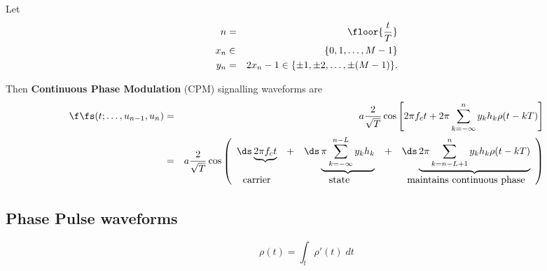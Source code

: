 \begin{definition}
\label{def:CPM}
Let 
\begin{eqnarray*}
   n   & = & \floor{\frac{t}{T}} \\
   x_n &\in& \{0,1,\ldots, M-1 \} \\
   y_n & = & 2x_n -1 \in \{ \pm1, \pm2,\ldots, \pm(M-1)\}.
\end{eqnarray*}

Then
{\bf Continuous Phase Modulation} (CPM) signalling waveforms are
\begin{eqnarray*}
   \f\fs(t;\ldots,u_{n-1},u_n)
     &=& a \frac{2}{\sqrt{T}} 
           \cos\left[ 
              2\pi f_ct + 
              2\pi\sum_{k=-\infty}^n y_k h_k \rho(t-kT)
           \right]
   \\&=& a \frac{2}{\sqrt{T}} 
           \cos\left( \begin{array}{ccccc}
              \ds \underbrace{2\pi f_ct} &+&
              \ds \underbrace{\pi \sum_{k=-\infty}^{n-L} y_k h_k}  &+&
              \ds \underbrace{2\pi \sum_{k=n-L+1}^n y_k h_k \rho(t-kT)}
              \\
              \mbox{carrier} && \mbox{state} && \mbox{maintains continuous phase}
           \end{array}
           \right)
\end{eqnarray*}
\end{definition}


\subsection{Phase Pulse waveforms}
\[   \rho(t) = \int_t \rho'(t) \; dt \]

